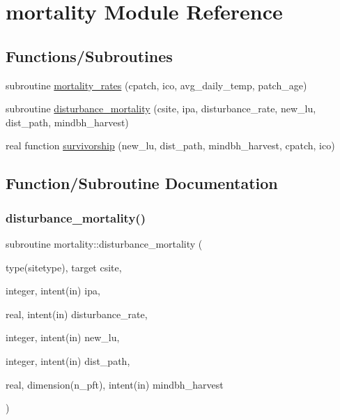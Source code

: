 \hypertarget{namespacemortality}{}\section{mortality Module Reference}
\label{namespacemortality}
\subsection*{Functions/\+Subroutines}
\begin{DoxyCompactItemize}
\item 
subroutine \hyperlink{namespacemortality_af7ebabdd3dd650224f2a5ddfac2f888e}{mortality\+\_\+rates} (cpatch, ico, avg\+\_\+daily\+\_\+temp, patch\+\_\+age)
\item 
subroutine \hyperlink{namespacemortality_ad39b2a4fec25ad294a703474c4e5a733}{disturbance\+\_\+mortality} (csite, ipa, disturbance\+\_\+rate, new\+\_\+lu, dist\+\_\+path, mindbh\+\_\+harvest)
\item 
real function \hyperlink{namespacemortality_aae8b4072e1f5c7c59cc76370de99d271}{survivorship} (new\+\_\+lu, dist\+\_\+path, mindbh\+\_\+harvest, cpatch, ico)
\end{DoxyCompactItemize}


\subsection{Function/\+Subroutine Documentation}
\mbox{\label{namespacemortality_ad39b2a4fec25ad294a703474c4e5a733}} 
\subsubsection{\texorpdfstring{disturbance\+\_\+mortality()}{disturbance\_mortality()}}
{\footnotesize\ttfamily subroutine mortality\+::disturbance\+\_\+mortality (\begin{DoxyParamCaption}\item[{type(sitetype), target}]{csite,  }\item[{integer, intent(in)}]{ipa,  }\item[{real, intent(in)}]{disturbance\+\_\+rate,  }\item[{integer, intent(in)}]{new\+\_\+lu,  }\item[{integer, intent(in)}]{dist\+\_\+path,  }\item[{real, dimension(n\+\_\+pft), intent(in)}]{mindbh\+\_\+harvest }\end{DoxyParamCaption})}

